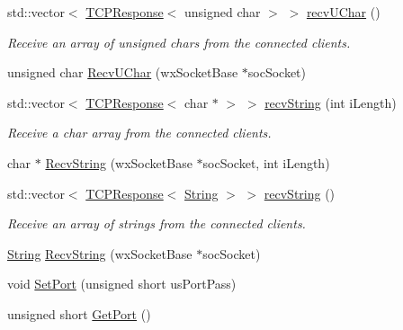 \begin{DoxyCompactItemize}
\item 
std\+::vector$<$ \hyperlink{class_rad_j_a_v_1_1_networking_1_1_t_c_p_response}{T\+C\+P\+Response}$<$ unsigned char $>$ $>$ \hyperlink{class_rad_j_a_v_1_1_networking_1_1wx_widgets_t_c_p_server_ab4f0c794a4711e14b805f0ffde01160c}{recv\+U\+Char} ()
\begin{DoxyCompactList}\small\item\em Receive an array of unsigned chars from the connected clients. \end{DoxyCompactList}\item 
unsigned char \hyperlink{class_rad_j_a_v_1_1_networking_1_1wx_widgets_t_c_p_server_a424a50ecae9cde2a17b90e6a0fd2f32f}{Recv\+U\+Char} (wx\+Socket\+Base $\ast$soc\+Socket)
\item 
std\+::vector$<$ \hyperlink{class_rad_j_a_v_1_1_networking_1_1_t_c_p_response}{T\+C\+P\+Response}$<$ char $\ast$ $>$ $>$ \hyperlink{class_rad_j_a_v_1_1_networking_1_1wx_widgets_t_c_p_server_a6b3ea7891f3111f89cd1610a9b1db15d}{recv\+String} (int i\+Length)
\begin{DoxyCompactList}\small\item\em Receive a char array from the connected clients. \end{DoxyCompactList}\item 
char $\ast$ \hyperlink{class_rad_j_a_v_1_1_networking_1_1wx_widgets_t_c_p_server_add4a137d2a89f6fb6a64c7b8055f46c2}{Recv\+String} (wx\+Socket\+Base $\ast$soc\+Socket, int i\+Length)
\item 
std\+::vector$<$ \hyperlink{class_rad_j_a_v_1_1_networking_1_1_t_c_p_response}{T\+C\+P\+Response}$<$ \hyperlink{class_rad_j_a_v_1_1_string}{String} $>$ $>$ \hyperlink{class_rad_j_a_v_1_1_networking_1_1wx_widgets_t_c_p_server_ac33b6977b1d527476c8f95eb91464fd9}{recv\+String} ()
\begin{DoxyCompactList}\small\item\em Receive an array of strings from the connected clients. \end{DoxyCompactList}\item 
\hyperlink{class_rad_j_a_v_1_1_string}{String} \hyperlink{class_rad_j_a_v_1_1_networking_1_1wx_widgets_t_c_p_server_ae10f57d8657a085aaad9ea967cfcdda3}{Recv\+String} (wx\+Socket\+Base $\ast$soc\+Socket)
\item 
void \hyperlink{class_rad_j_a_v_1_1_networking_1_1wx_widgets_t_c_p_server_a3779c06a1fca6293155a34008ae044d3}{Set\+Port} (unsigned short us\+Port\+Pass)
\item 
unsigned short \hyperlink{class_rad_j_a_v_1_1_networking_1_1wx_widgets_t_c_p_server_a0a8c3796d3ea9536001e993155f9ffca}{Get\+Port} ()

\end{DoxyCompactItemize}
